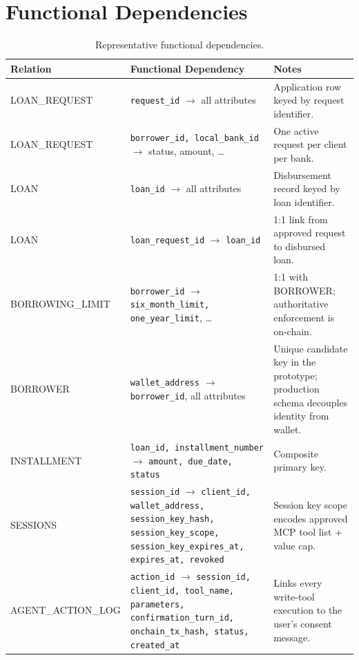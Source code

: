\documentclass[12pt,a4paper]{report}
\newcommand{\tableheadcolor}{\rowcolor{TableHeadBg}}
\begin{document}
\section{Functional Dependencies}

\begin{table}[H]
\centering
\caption[Representative functional dependencies]{Representative functional dependencies.}
\label{tab:functional-deps}
\begin{tabular}{p{3cm}p{5.5cm}p{5cm}}
\toprule
\tableheadcolor
\textbf{Relation} & \textbf{Functional Dependency} & \textbf{Notes} \\
\midrule
LOAN\_REQUEST & \texttt{request\_id} $\to$ all attributes & Application row keyed by request identifier. \\
LOAN\_REQUEST & \texttt{borrower\_id, local\_bank\_id} $\to$ status, amount, \ldots & One active request per client per bank. \\
LOAN & \texttt{loan\_id} $\to$ all attributes & Disbursement record keyed by loan identifier. \\
LOAN & \texttt{loan\_request\_id} $\to$ \texttt{loan\_id} & 1:1 link from approved request to disbursed loan. \\
BORROWING\_LIMIT & \texttt{borrower\_id} $\to$ \texttt{six\_month\_limit, one\_year\_limit}, \ldots & 1:1 with BORROWER; authoritative enforcement is on-chain. \\
BORROWER & \texttt{wallet\_address} $\to$ \texttt{borrower\_id}, all attributes & Unique candidate key in the prototype; production schema decouples identity from wallet. \\
INSTALLMENT & \texttt{loan\_id, installment\_number} $\to$ \texttt{amount, due\_date, status} & Composite primary key. \\
SESSIONS & \texttt{session\_id} $\to$ \texttt{client\_id, wallet\_address, session\_key\_hash,} \newline \texttt{session\_key\_scope, session\_key\_expires\_at,} \newline \texttt{expires\_at, revoked} & Session key scope encodes approved MCP tool list + value cap. \\
AGENT\_ACTION\_LOG & \texttt{action\_id} $\to$ \texttt{session\_id, client\_id, tool\_name,} \newline \texttt{parameters, confirmation\_turn\_id,} \newline \texttt{onchain\_tx\_hash, status, created\_at} & Links every write-tool execution to the user's consent message. \\

\end{tabular}
\end{table}
\end{document}
